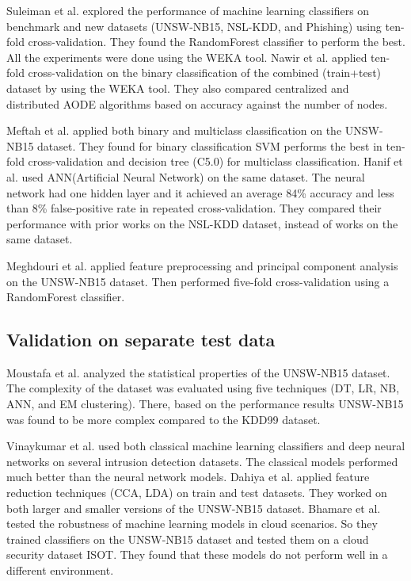 \documentclass[14pt, conference]{IEEEtran}
\begin{document}
 Suleiman et al. \cite{suleiman2018performance} explored the performance of machine learning classifiers on benchmark
and new datasets (UNSW-NB15, NSL-KDD, and Phishing) using ten-fold cross-validation. They found the RandomForest
classifier to perform the best. All the experiments were done using the WEKA tool. 
Nawir et al. \cite{nawir2019effective} applied ten-fold cross-validation on the binary classification of the combined
(train+test) dataset by using the WEKA tool. They also compared centralized and distributed AODE algorithms based on accuracy against the number of nodes. 

Meftah et al. \cite{meftah2019network} applied both binary and multiclass classification on the UNSW-NB15 dataset. They found for binary classification SVM performs the best in ten-fold
cross-validation and decision tree (C5.0) for multiclass classification.
Hanif et al. \cite{hanif2019intrusion} used ANN(Artificial Neural Network) on the same dataset. The neural network had one hidden layer and it achieved an average 84\% accuracy and less
than 8\% false-positive rate in repeated cross-validation. They compared their performance with prior works on the NSL-KDD dataset, instead of works on the same dataset.
 
 Meghdouri et al. \cite{meghdouri2018analysis} applied feature preprocessing and principal component analysis on the UNSW-NB15 dataset. Then performed five-fold cross-validation using a RandomForest classifier.

\subsection{Validation on separate test data}
Moustafa et al. \cite{moustafa2016evaluation} analyzed the statistical properties of the UNSW-NB15 dataset. The complexity of the dataset was evaluated using five techniques (DT, LR, NB, ANN, and EM clustering). There, based on the performance results UNSW-NB15 was found to be more complex compared to the KDD99 dataset.

Vinaykumar et al. \cite{vinayakumar2019deep} used both classical machine learning classifiers and deep neural networks on several intrusion detection datasets. The classical models performed much better than the neural network models.
Dahiya et al. \cite{dahiya2018network} applied feature reduction techniques (CCA, LDA) on train and test datasets. They worked on both larger and smaller versions of the UNSW-NB15 dataset. Bhamare et al. \cite{bhamare2016feasibility} tested the robustness of machine learning models in cloud scenarios. So they trained classifiers on the UNSW-NB15 dataset and tested them on a cloud security dataset ISOT. They found that these models do not perform well in a different environment.
\end{document}
